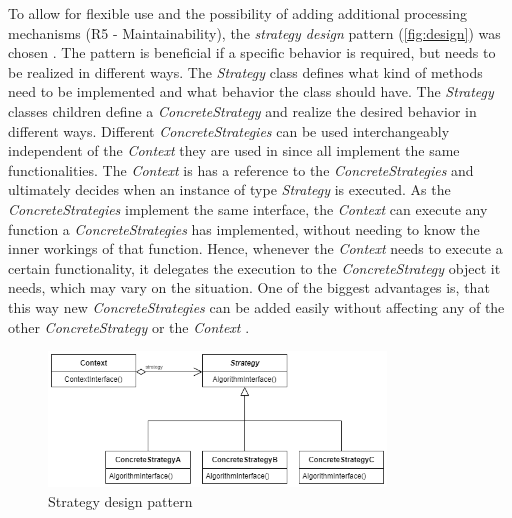 To allow for flexible use and the possibility of adding additional processing mechanisms (R5 - Maintainability), the \textit{strategy design} pattern (\autoref{fig:design}) was chosen \cite{gamma1994design}.
The pattern is beneficial if a specific behavior is required, but needs to be realized in different ways.
The \textit{Strategy} class defines what kind of methods need to be implemented and what behavior the class should have.
The \textit{Strategy} classes children define a \textit{ConcreteStrategy} and realize the desired behavior in different ways.
Different \textit{ConcreteStrategies} can be used interchangeably independent of the \textit{Context} they are used in since all implement the same functionalities.
The \textit{Context} is has a reference to the \textit{ConcreteStrategies} and ultimately decides when an instance of type \textit{Strategy} is executed.
As the \textit{ConcreteStrategies} implement the same interface, the \textit{Context} can execute any function a \textit{ConcreteStrategies} has implemented, without needing to know the inner workings of that function.
Hence, whenever the \textit{Context} needs to execute a certain functionality, it delegates the execution to the \textit{ConcreteStrategy} object it needs, which may vary on the situation.
One of the biggest advantages is, that this way new \textit{ConcreteStrategies} can be added easily without affecting any of the other \textit{ConcreteStrategy} or the \textit{Context} \cite{gamma1994design}.

\begin{figure}[h]
	\centering
	\includegraphics[width=0.8\textwidth]{images/strategy.png}
	\caption[Strategy Design Pattern]{Strategy design pattern \cite[p. 316]{gamma1994design}}
	\label{fig:design}
\end{figure}

